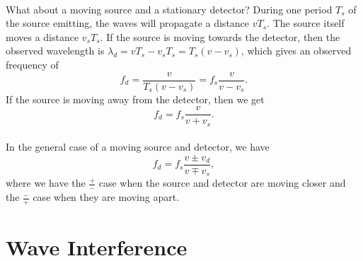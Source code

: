 \documentclass[../classical_mechanics.tex]{subfiles}
\begin{document}
        \paragraph{}
        What about a moving source and a stationary detector?
        During one period $T_s$ of the source emitting, the waves will propagate a distance $vT_s$.
        The source itself moves a distance $v_sT_s$.
        If the source is moving towards the detector, then the observed wavelength is $\lambda_d=vT_s-v_sT_s=T_s(v-v_s)$, which gives an observed frequency of
        \begin{equation}
            f_d=\frac{v}{T_s(v-v_s)}=f_s\frac{v}{v-v_s}.
        \end{equation}
        If the source is moving away from the detector, then we get
        \begin{equation}
            f_d=f_s\frac{v}{v+v_s}.
        \end{equation}

        \paragraph{}
        In the general case of a moving source and detector, we have
        \begin{equation}
            f_d=f_s\frac{v\pm v_d}{v\mp v_s},
        \end{equation}
        where we have the $\frac{+}{-}$ case when the source and detector are moving closer and the $\frac{-}{+}$ case when they are moving apart.

    \section{Wave Interference}
\end{document}
